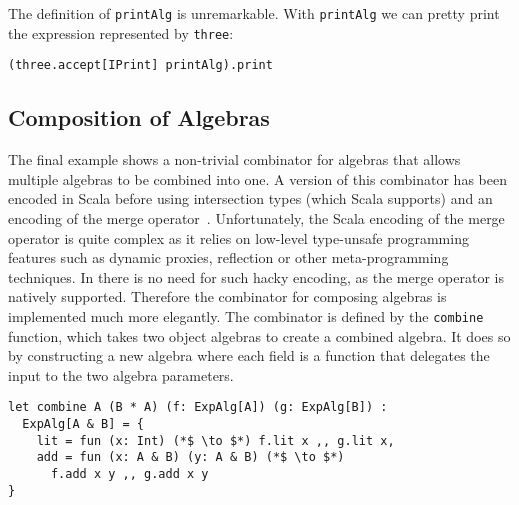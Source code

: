 \noindent The definition of \lstinline{printAlg} is unremarkable.
With \lstinline{printAlg} we can pretty print the expression represented
by \lstinline{three}:

\begin{lstlisting}
(three.accept[IPrint] printAlg).print
\end{lstlisting}

%
\subsection{Composition of Algebras}
The final example shows a non-trivial combinator for algebras that
allows multiple algebras to be combined into one. A version of this
combinator has been encoded in Scala before using intersection types
(which Scala supports) and an encoding of the merge
operator~\cite{oliveira2013feature,rendel14attributes}.
Unfortunately, the Scala encoding of the merge operator is quite complex as
it relies on low-level type-unsafe programming features such as
dynamic proxies, reflection or other meta-programming techniques.
In \namedis there is no need for such hacky encoding, as the
merge operator is natively supported. Therefore the combinator for
composing algebras is implemented much more elegantly.
The combinator is defined by the \lstinline$combine$ function, which takes two object algebras to create
a combined algebra. It does so by constructing a new algebra
where each field is a function that delegates the input to the two
algebra parameters.

\begin{lstlisting}
let combine A (B * A) (f: ExpAlg[A]) (g: ExpAlg[B]) :
  ExpAlg[A & B] = {
    lit = fun (x: Int) (*$ \to $*) f.lit x ,, g.lit x,
    add = fun (x: A & B) (y: A & B) (*$ \to $*)
      f.add x y ,, g.add x y
}
\end{lstlisting}

